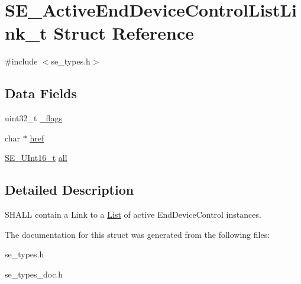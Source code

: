 \hypertarget{structSE__ActiveEndDeviceControlListLink__t}{}\section{S\+E\+\_\+\+Active\+End\+Device\+Control\+List\+Link\+\_\+t Struct Reference}
\label{structSE__ActiveEndDeviceControlListLink__t}


{\ttfamily \#include $<$se\+\_\+types.\+h$>$}

\subsection*{Data Fields}
\begin{DoxyCompactItemize}
\item 
uint32\+\_\+t \hyperlink{group__ActiveEndDeviceControlListLink_gad2890eef1f191fbfa7bc7986e8c43b0a}{\+\_\+flags}
\item 
char $\ast$ \hyperlink{group__ActiveEndDeviceControlListLink_ga638f47411afef0238c82266ba67860d5}{href}
\item 
\hyperlink{group__UInt16_gac68d541f189538bfd30cfaa712d20d29}{S\+E\+\_\+\+U\+Int16\+\_\+t} \hyperlink{group__ActiveEndDeviceControlListLink_ga2db41b3930721cb02927b5472619b213}{all}
\end{DoxyCompactItemize}


\subsection{Detailed Description}
S\+H\+A\+LL contain a Link to a \hyperlink{structList}{List} of active End\+Device\+Control instances. 

The documentation for this struct was generated from the following files\+:\begin{DoxyCompactItemize}
\item 
se\+\_\+types.\+h\item 
se\+\_\+types\+\_\+doc.\+h\end{DoxyCompactItemize}
